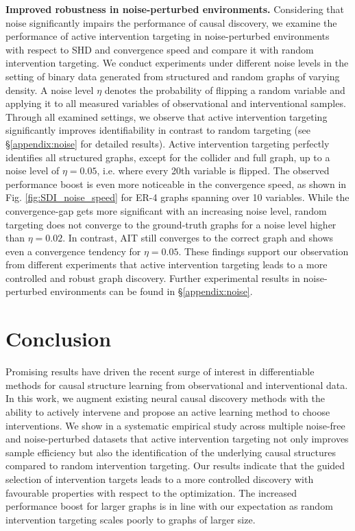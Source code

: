\documentclass[nohyperref]{article}
\theoremstyle{plain}
\theoremstyle{definition}
\theoremstyle{remark}
\begin{document}
\textbf{Improved robustness in noise-perturbed environments.}
\label{sec:results_noise}
Considering that noise significantly impairs the performance of causal discovery, we examine the performance of active intervention targeting in noise-perturbed environments with respect to SHD and convergence speed and compare it with random intervention targeting. We conduct experiments under different noise levels in the setting of binary data generated from structured and random graphs of varying density. A noise level $\eta$ denotes the probability of flipping a random variable and applying it to all measured variables of observational and interventional samples. Through all examined settings, we observe that active intervention targeting significantly improves identifiability in contrast to random targeting (see \S \ref{appendix:noise} for detailed results). Active intervention targeting perfectly identifies all structured graphs, except for the collider and full graph, up to a noise level of $\eta=0.05$, i.e. where every 20th variable is flipped. 
The observed performance boost is even more noticeable in the convergence speed, as shown in Fig. \ref{fig:SDI_noise_speed} for ER-4 graphs spanning over 10 variables. While the convergence-gap gets more significant with an increasing noise level, random targeting does not converge to the ground-truth graphs for a noise level higher than $\eta = 0.02$. In contrast, AIT still converges to the correct graph and shows even a convergence tendency for $\eta = 0.05$. These findings support our observation from different experiments that active intervention targeting leads to a more controlled and robust graph discovery. Further experimental results in noise-perturbed environments can be found in \S\ref{appendix:noise}.


\vspace{-2mm}
\section{Conclusion}
\vspace{-2mm}
Promising results have driven the recent surge of interest in differentiable methods for causal structure learning from observational and interventional data. In this work, we augment existing neural causal discovery methods with the ability to actively intervene and propose an active learning method to choose interventions. We show in a systematic empirical study across multiple noise-free and noise-perturbed datasets that active intervention targeting not only improves sample efficiency but also the identification of the underlying causal structures compared to random intervention targeting. Our results indicate that the guided selection of intervention targets leads to a more controlled discovery with favourable properties with respect to the optimization. The increased performance boost for larger graphs is in line with our expectation as random intervention targeting scales poorly to graphs of larger size. 
\end{document}
